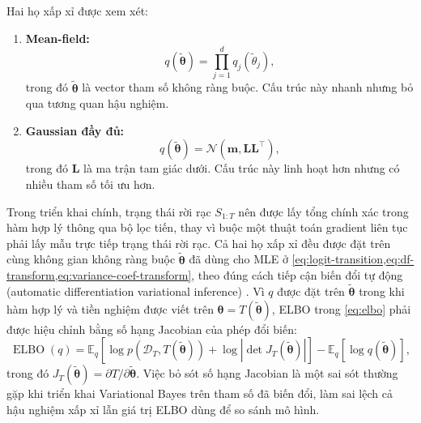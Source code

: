 \documentclass[12pt,a4paper]{article}
\numberwithin{equation}{section}
\newcommand{\bm}[1]{\symbf{#1}}
\newcommand{\Data}{\mathcal{D}}
\newcommand{\Param}{\bm{\theta}}
\newcommand{\E}{\mathbb{E}}
\newcommand{\ELBO}{\operatorname{ELBO}}
\begin{document}
Hai họ xấp xỉ được xem xét:
\begin{enumerate}
  \item \textbf{Mean-field:}
  \begin{equation}
    q(\widetilde{\Param})
    =\prod_{j=1}^{d}q_j(\widetilde\theta_j),
    \label{eq:mean-field}
  \end{equation}
  trong đó $\widetilde{\Param}$ là vector tham số không ràng buộc. Cấu trúc này nhanh nhưng bỏ qua tương quan hậu nghiệm.
  \item \textbf{Gaussian đầy đủ:}
  \begin{equation}
    q(\widetilde{\Param})
    =\mathcal{N}(\bm m,\bm L\bm L^{\top}),
    \label{eq:full-rank-vi}
  \end{equation}
  trong đó $\bm L$ là ma trận tam giác dưới. Cấu trúc này linh hoạt hơn nhưng có nhiều tham số tối ưu hơn.
\end{enumerate}

Trong triển khai chính, trạng thái rời rạc $S_{1:T}$ nên được lấy tổng chính xác trong hàm hợp lý thông qua bộ lọc tiến, thay vì buộc một thuật toán gradient liên tục phải lấy mẫu trực tiếp trạng thái rời rạc. Cả hai họ xấp xỉ đều được đặt trên cùng không gian không ràng buộc $\widetilde{\Param}$ đã dùng cho MLE ở \cref{eq:logit-transition,eq:df-transform,eq:variance-coef-transform}, theo đúng cách tiếp cận biến đổi tự động (automatic differentiation variational inference) \cite{kucukelbir2017}. Vì $q$ được đặt trên $\widetilde{\Param}$ trong khi hàm hợp lý và tiền nghiệm được viết trên $\Param=T(\widetilde{\Param})$, ELBO trong \cref{eq:elbo} phải được hiệu chỉnh bằng số hạng Jacobian của phép đổi biến:
\begin{equation}
  \ELBO(q)
  =
  \E_{q}\!\left[
    \log p\!\left(\Data_T, T(\widetilde{\Param})\right)
    +\log\left|\det J_T(\widetilde{\Param})\right|
  \right]
  -\E_{q}\!\left[\log q(\widetilde{\Param})\right],
  \label{eq:elbo-jacobian}
\end{equation}
trong đó $J_T(\widetilde{\Param})=\partial T/\partial\widetilde{\Param}$. Việc bỏ sót số hạng Jacobian là một sai sót thường gặp khi triển khai Variational Bayes trên tham số đã biến đổi, làm sai lệch cả hậu nghiệm xấp xỉ lẫn giá trị ELBO dùng để so sánh mô hình.
\end{document}
